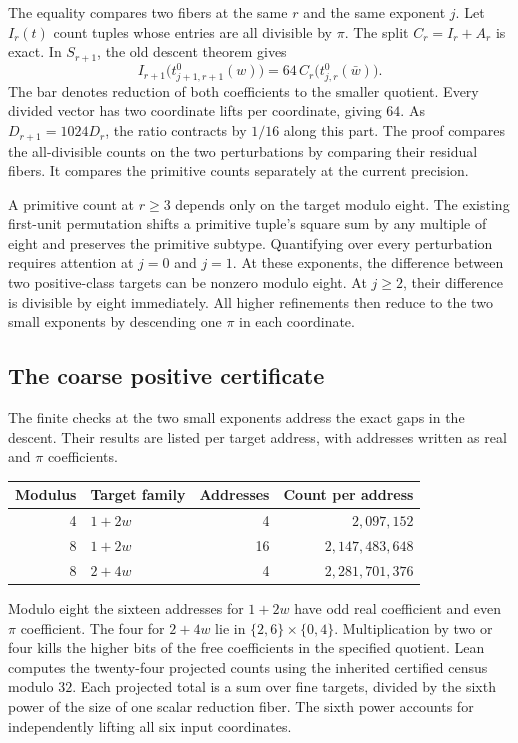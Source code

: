 \documentclass[12pt,letterpaper]{article}
\begin{document}
The equality compares two fibers at the same $r$ and the same exponent $j$. Let $I_r(t)$ count tuples whose entries are all divisible by $\pi$. The split $C_r=I_r+A_r$ is exact. In $S_{r+1}$, the old descent theorem gives
\[
 I_{r+1}\bigl(t_{j+1,r+1}^0(w)\bigr)
 = 64\,C_r\bigl(t_{j,r}^0(\bar w)\bigr).
\]
The bar denotes reduction of both coefficients to the smaller quotient. Every divided vector has two coordinate lifts per coordinate, giving $64$. As $D_{r+1}=1024D_r$, the ratio contracts by $1/16$ along this part. The proof compares the all-divisible counts on the two perturbations by comparing their residual fibers. It compares the primitive counts separately at the current precision.

A primitive count at $r\geq3$ depends only on the target modulo eight. The existing first-unit permutation shifts a primitive tuple's square sum by any multiple of eight and preserves the primitive subtype. Quantifying over every perturbation requires attention at $j=0$ and $j=1$. At these exponents, the difference between two positive-class targets can be nonzero modulo eight. At $j\geq2$, their difference is divisible by eight immediately. All higher refinements then reduce to the two small exponents by descending one $\pi$ in each coordinate.

\subsection{The coarse positive certificate}
The finite checks at the two small exponents address the exact gaps in the descent. Their results are listed per target address, with addresses written as real and $\pi$ coefficients.
\begin{center}
\begin{tabular}{@{}r l r r@{}}
\toprule
Modulus & Target family & Addresses & Count per address \\
\midrule
4 & $1+2w$ & 4 & $2{,}097{,}152$ \\
8 & $1+2w$ & 16 & $2{,}147{,}483{,}648$ \\
8 & $2+4w$ & 4 & $2{,}281{,}701{,}376$ \\
\bottomrule
\end{tabular}
\end{center}
Modulo eight the sixteen addresses for $1+2w$ have odd real coefficient and even $\pi$ coefficient. The four for $2+4w$ lie in $\{2,6\}\times\{0,4\}$. Multiplication by two or four kills the higher bits of the free coefficients in the specified quotient. Lean computes the twenty-four projected counts using the inherited certified census modulo $32$. Each projected total is a sum over fine targets, divided by the sixth power of the size of one scalar reduction fiber. The sixth power accounts for independently lifting all six input coordinates.
\end{document}
